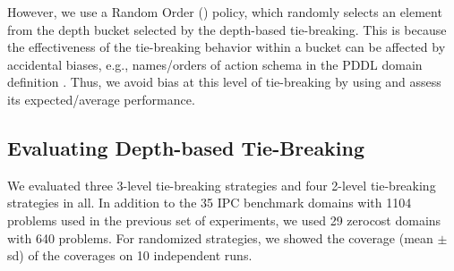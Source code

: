 However, 
we use a Random Order (\ro) policy, which 
randomly selects an element from the depth bucket selected by the depth-based tie-breaking.
This is because the effectiveness of the tie-breaking behavior within a bucket
can be affected by accidental biases, e.g., names/orders of action schema in the PDDL domain
definition \cite{vallati2015effective}.
Thus, we avoid bias at this level of tie-breaking by using \ro and assess its expected/average
performance.





\subsection{Evaluating Depth-based Tie-Breaking}
\label{sec:depth-based-evaluation}
We evaluated three 3-level tie-breaking strategies and four 2-level
tie-breaking strategies in all.
% 
In addition to the 35 IPC benchmark domains with 1104 problems used in
the previous set of experiments, we used 29 zerocost domains with 640
problems. For randomized strategies, we
showed the coverage (mean $\pm$ sd) of the coverages on
10 independent runs.


